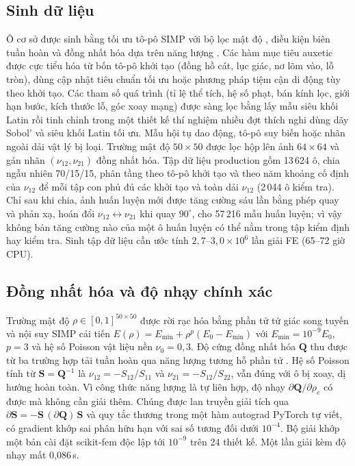 \documentclass[a4paper,11pt]{article}
\newcommand{\nuot}{\nu_{12}}
\newcommand{\nuto}{\nu_{21}}
\begin{document}
\subsection{Sinh dữ liệu}
Ô cơ sở được sinh bằng tối ưu tô-pô SIMP
\citep{bendsoe1989optimal,sigmund2001code,andreassen2011efficient} với bộ
lọc mật độ \citep{bourdin2001filters}, điều kiện biên tuần hoàn và đồng nhất
hóa dựa trên năng lượng
\citep{guedes1990preprocessing,andreassen2014homogenization,xia2015design}.
Các hàm mục tiêu auxetic được cực tiểu hóa từ bốn tô-pô khởi tạo (đồng hồ
cát, lục giác, nơ lõm vào, lỗ tròn), dùng cập nhật tiêu chuẩn tối ưu hoặc
phương pháp tiệm cận di động \citep{svanberg1987mma} tùy theo khởi tạo. Các
tham số quá trình (tỉ lệ thể tích, hệ số phạt, bán kính lọc, giới hạn bước,
kích thước lỗ, góc xoay mạng) được sàng lọc bằng lấy mẫu siêu khối Latin
\citep{mckay1979lhs} rồi tinh chỉnh trong một thiết kế thí nghiệm nhiều đợt
thích nghi dùng dãy Sobol' \citep{sobol1967distribution} và siêu khối Latin
tối ưu. Mẫu hội tụ dao động, tô-pô suy biến hoặc nhãn ngoài dải vật lý bị
loại. Trường mật độ $50\times50$ được lọc hộp lên ảnh $64\times64$ và gán
nhãn $(\nuot,\nuto)$ đồng nhất hóa. Tập dữ liệu production gồm 13\,624 ô,
chia ngẫu nhiên 70/15/15, phân tầng theo tô-pô khởi tạo và theo năm khoảng
cố định của $\nuot$ để mỗi tập con phủ đủ các khởi tạo và toàn dải $\nuot$
(2\,044 ô kiểm tra). Chỉ sau khi chia, ảnh huấn luyện mới được tăng cường sáu
lần bằng phép quay và phản xạ, hoán đổi $\nuot\leftrightarrow\nuto$ khi quay
$90^{\circ}$, cho 57\,216 mẫu huấn luyện; vì vậy không bản tăng cường nào của
một ô huấn luyện có thể nằm trong tập kiểm định hay kiểm tra. Sinh tập dữ
liệu cần ước tính $2,7$--$3,0\times10^{6}$ lần giải FE (65--72 giờ CPU).

\subsection{Đồng nhất hóa và độ nhạy chính xác}
Trường mật độ $\rho\in[0,1]^{50\times50}$ được rời rạc hóa bằng phần tử tứ
giác song tuyến và nội suy SIMP cải tiến
$E(\rho)=E_{\min}+\rho^{p}(E_0-E_{\min})$ với $E_{\min}=10^{-9}E_0$, $p=3$ và
hệ số Poisson vật liệu nền $\nu_0=0,3$. Độ cứng đồng nhất hóa $\mathbf{Q}$
thu được từ ba trường hợp tải tuần hoàn qua năng lượng tương hỗ phần tử
\citep{xia2015design}. Hệ số Poisson tính từ $\mathbf{S}=\mathbf{Q}^{-1}$ là
$\nuot=-S_{12}/S_{11}$ và $\nuto=-S_{12}/S_{22}$, vẫn đúng với ô bị xoay, dị
hướng hoàn toàn. Vì công thức năng lượng là tự liên hợp, độ nhạy
$\partial\mathbf{Q}/\partial\rho_e$ có được mà không cần giải thêm. Chúng
được lan truyền giải tích qua
$\partial\mathbf{S}=-\mathbf{S}\,(\partial\mathbf{Q})\,\mathbf{S}$ và quy
tắc thương trong một hàm autograd PyTorch \citep{paszke2019pytorch} tự viết,
có gradient khớp sai phân hữu hạn với sai số tương đối dưới $10^{-4}$. Bộ
giải khớp một bản cài đặt scikit-fem độc lập \citep{gustafsson2020skfem} tới
$10^{-9}$ trên 24 thiết kế. Một lần giải kèm độ nhạy mất 0,086\,s.
\end{document}
